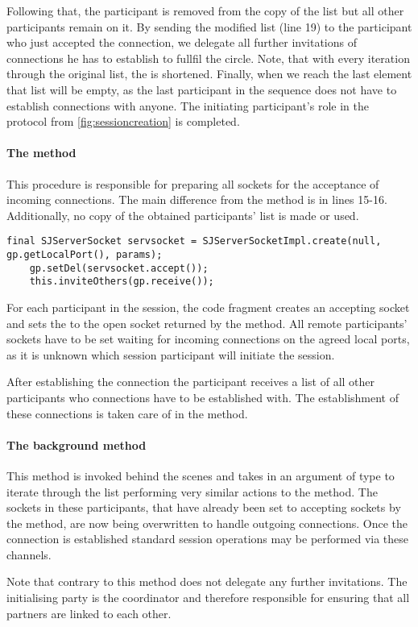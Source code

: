 Following that, the participant is removed from the copy of the list but all other participants remain on it. By sending the modified list (line 19) to the participant who just accepted the connection, we delegate all further invitations of connections he has to establish to fullfil the circle. Note, that with every iteration through the original list, the  is shortened. Finally, when we reach the last element that list will be empty, as the last participant in the sequence does not have to establish connections with anyone. The initiating participant's role in the protocol from \autoref{fig:sessioncreation} is completed. 


\paragraph*{The  method} This procedure is responsible for preparing all sockets for the acceptance of incoming connections. The main difference from the  method is in lines 15-16. Additionally, no copy of the obtained participants' list is made or used.

\begin{lstlisting}[basicstyle=\LISTINGSTYLE]
	final SJServerSocket servsocket = SJServerSocketImpl.create(null, gp.getLocalPort(), params);
	gp.setDel(servsocket.accept());
	this.inviteOthers(gp.receive());	
\end{lstlisting}

For each participant in the session, the code fragment creates an accepting socket and sets the  to the open socket returned by the  method. All remote participants' sockets have to be set waiting for incoming connections on the agreed local ports, as it is unknown which session participant will initiate the session.

After establishing the connection the participant receives a list of all other participants who connections have to be established with. The establishment of these connections is taken care of in the  method.

\paragraph*{The  background method}

This method is invoked behind the scenes and takes in an argument of type  to iterate through the list performing very similar actions to the  method. The sockets in these participants, that have already been set to accepting sockets by the  method, are now being overwritten to handle outgoing connections. Once the connection is established standard session operations may be performed via these channels.

Note that contrary to  this method does not delegate any further invitations. The initialising party is the coordinator and therefore responsible for ensuring that all partners are linked to each other.